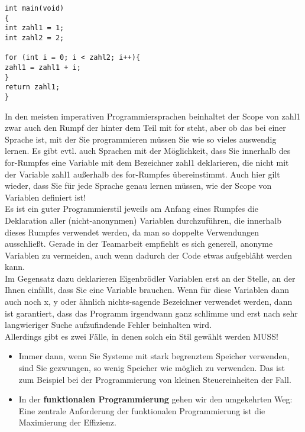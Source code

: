 \begin{verbatim}
int main(void)
{
int zahl1 = 1;
int zahl2 = 2;

for (int i = 0; i < zahl2; i++){
zahl1 = zahl1 + i;
}
return zahl1;
}
\end{verbatim}

In den meisten imperativen Programmiersprachen beinhaltet der Scope von zahl1 zwar auch den Rumpf der hinter dem Teil mit for steht, aber ob das bei einer Sprache ist, mit der Sie programmieren müssen Sie wie so vieles auswendig lernen. Es gibt evtl. auch Sprachen mit der Möglichkeit, dass Sie innerhalb des for-Rumpfes eine Variable mit dem Bezeichner zahl1 deklarieren, die nicht mit der Variable zahl1 außerhalb des for-Rumpfes übereinstimmt. Auch hier gilt wieder, dass Sie für jede Sprache genau lernen müssen, wie der Scope von Variablen definiert ist!\\

Es ist ein guter Programmierstil jeweils am Anfang eines Rumpfes die Deklaration aller (nicht-anonynmen) Variablen durchzuführen, die innerhalb dieses Rumpfes verwendet werden, da man so doppelte Verwendungen ausschließt. Gerade in der Teamarbeit empfiehlt es sich generell, anonyme Variablen zu vermeiden, auch wenn dadurch der Code etwas aufgebläht werden kann.\\

Im Gegensatz dazu deklarieren Eigenbrödler Variablen erst an der Stelle, an der Ihnen einfällt, dass Sie eine Variable brauchen. Wenn für diese Variablen dann auch noch x, y oder ähnlich nichts-sagende Bezeichner verwendet werden, dann ist garantiert, dass das Programm irgendwann ganz schlimme und erst nach sehr langwieriger Suche aufzufindende Fehler beinhalten wird.\\

Allerdings gibt es zwei Fälle, in denen solch ein Stil gewählt werden MUSS!

\begin{itemize}
	\item Immer dann, wenn Sie Systeme mit stark begrenztem Speicher verwenden, sind Sie gezwungen, so wenig Speicher wie möglich zu verwenden. Das ist zum Beispiel bei der Programmierung von kleinen Steuereinheiten der Fall.
	\item In der \textbf{funktionalen Programmierung} gehen wir den umgekehrten Weg: Eine zentrale Anforderung der funktionalen Programmierung ist die Maximierung der Effizienz.
\end{itemize}

